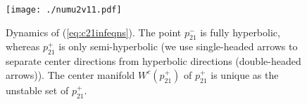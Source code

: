 \documentclass[reqno,12pt]{amsart}
\renewcommand{\eqref}[1]{(\ref{eq:#1})}
\newcommand{\figlab}[1]{\label{fig:#1}}
\numberwithin{equation}{section}
\begin{document}
\begin{figure}[h!]
 	\begin{center}
 		{\texttt{[image: ./numu2v11.pdf]}}
 		\caption{Dynamics of \eqref{c21infeqns}. The point $p_{21}^-$ is fully hyperbolic, whereas $p_{21}^+$ is only semi-hyperbolic (we use single-headed arrows to separate center directions from hyperbolic directions (double-headed arrows)). The center manifold $W^c(p_{21}^+)$ of $p_{21}^+$ is unique as the unstable set of $p_{21}^+$. }\figlab{numu2v11}
 	\end{center}
 \end{figure}
\end{document}
